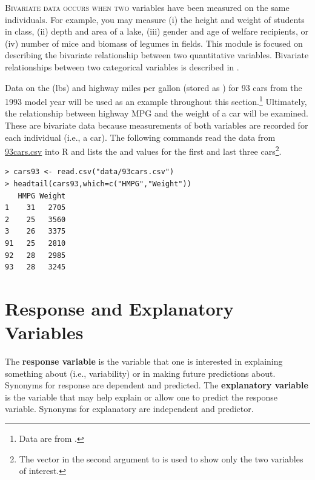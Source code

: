 \documentclass[10pt,openany]{book}\usepackage[]{graphicx}\usepackage[]{color}
\makeatletter
\newenvironment{kframe}{%
 \def\at@end@of@kframe{}%
 \ifinner\ifhmode%
  \def\at@end@of@kframe{\end{minipage}}%
  \begin{minipage}{\columnwidth}%
 \fi\fi%
 \def\FrameCommand##1{\hskip\@totalleftmargin \hskip-\fboxsep
 \colorbox{shadecolor}{##1}\hskip-\fboxsep
     \hskip-\linewidth \hskip-\@totalleftmargin \hskip\columnwidth}%
 \MakeFramed {\advance\hsize-\width
   \@totalleftmargin\z@ \linewidth\hsize
   \@setminipage}}%
 {\par\unskip\endMakeFramed%
 \at@end@of@kframe}
\newenvironment{knitrout}{}{} %
\makeatother
\begin{document}
\minitoc
\vspace{24pt}

\lettrine{B}{ivariate data occurs when two} variables have been measured on the same individuals.  For example, you may measure (i) the height and weight of students in class, (ii) depth and area of a lake, (iii) gender and age of welfare recipients, or (iv) number of mice and biomass of legumes in fields. This module is focused on describing the bivariate relationship between two quantitative variables. Bivariate relationships between two categorical variables is described in .


Data on the  (lbs) and highway miles per gallon (stored as ) for 93 cars from the 1993 model year will be used as an example throughout this section.\footnote{Data are from \cite{Lock1993}.}  Ultimately, the relationship between highway MPG and the weight of a car will be examined.  These are bivariate data because measurements of both variables are recorded for each individual (i.e., a car). The following commands read the data from \href{https://raw.githubusercontent.com/droglenc/NCData/master/93cars.csv}{93cars.csv} into R and lists the  and  values for the first and last three cars\footnote{The vector in the second argument to  is used to show only the two variables of interest.}.
\begin{knitrout}
\color{fgcolor}\begin{kframe}
\begin{verbatim}
> cars93 <- read.csv("data/93cars.csv")
> headtail(cars93,which=c("HMPG","Weight"))
   HMPG Weight
1    31   2705
2    25   3560
3    26   3375
91   25   2810
92   28   2985
93   28   3245
\end{verbatim}
\end{kframe}
\end{knitrout}

\section{Response and Explanatory Variables} \label{sect:RespExplan1}
\vspace{-12pt}
The \textbf{response variable} is the variable that one is interested in explaining something about (i.e., variability) or in making future predictions about.  Synonyms for response are dependent and predicted.  The \textbf{explanatory variable} is the variable that may help explain or allow one to predict the response variable.  Synonyms for explanatory are independent and predictor.
\end{document}
